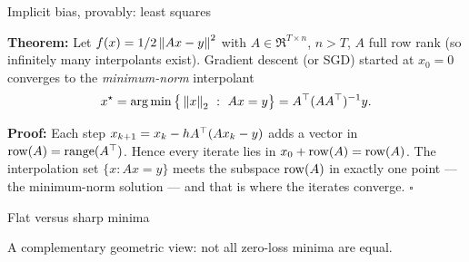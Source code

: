 \documentclass[9pt]{beamer}
\begin{document}
\begin{frame}{Implicit bias, provably: least squares}

  \textbf{Theorem:} Let $f(x)={1}/{2}\left\|Ax-y\right\|^2$ with $A\in\Re^{T\times n}$,
  $n>T$, $A$ full row rank (so infinitely many interpolants exist). Gradient descent
  (or SGD) started at $x_0=0$ converges to the \emph{minimum-norm} interpolant
  \[
    x^\star = \arg\min\big\{ \left\|x\right\|_2 ~:~ Ax = y \big\} = A^\top (A A^\top)^{-1} y.
  \]

  \vfill

  \textbf{Proof:} Each step $x_{k+1}=x_k - h A^\top(Ax_k-y)$ adds a vector in
  $\mathrm{row}(A)=\mathrm{range}(A^\top)$. Hence every iterate lies in $x_0 + \mathrm{row}(A) = \mathrm{row}(A)$.
  The interpolation set $\{x:Ax=y\}$ meets the subspace $\mathrm{row}(A)$ in exactly one
  point --- the minimum-norm solution --- and that is where the iterates converge.
  \hfill$\square$

\end{frame}

\begin{frame}{Flat versus sharp minima}

  A complementary geometric view: not all zero-loss minima are equal.

  \vfill

  \begin{center}
  \end{center}

\end{frame}
\end{document}
